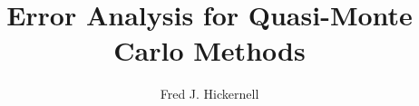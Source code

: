\documentclass[graybox,footinfo]{svmult}
\begin{document}
\newcommand{\MLE}{\text{MLE}}
\newcommand{\mC}{\mathsf{C}}
\newcommand{\Ex}{\mathbb{E}}
\newcommand{\Prob}{\mathbb{P}}
\newcommand{\cf}{\mathcal{F}}
\newcommand{\cl}{\mathcal{L}}
\newcommand{\cn}{\mathcal{N}}
\newcommand{\Order}{\mathcal{O}}
\newcommand{\cm}{\mathcal{M}}
\newcommand{\cg}{\mathcal{G}}
\newcommand{\cp}{\mathcal{P}}
\newcommand{\cu}{\mathcal{U}}
\newcommand{\cx}{\mathcal{X}}
\newcommand{\cy}{\mathcal{Y}}
\newcommand{\cz}{\mathcal{Z}}
\newcommand{\natm}{\N_{0,m}}
\newcommand{\cube}{[0,1)^d}
\newcommand{\hf}{\hat{f}}
\newcommand{\rf}{\mathring{f}}
\newcommand{\tf}{\tilde{f}}
\newcommand{\hg}{\hat{g}}
\newcommand{\hmu}{\widehat{\mu}}
\newcommand{\hI}{\hat{I}}
\newcommand{\tvk}{\tilde{\bsk}}
\newcommand{\hS}{\widehat{S}}
\newcommand{\tS}{\widetilde{S}}
\newcommand{\wcS}{\widecheck{S}}
\newcommand{\rnu}{\mathring{\nu}}
\newcommand{\tnu}{\widetilde{\nu}}
\newcommand{\hnu}{\widehat{\nu}}
\newcommand{\homega}{\widehat{\omega}}
\newcommand{\wcomega}{\mathring{\omega}}
\newcommand{\fC}{\mathfrak{C}}
\newcommand{\nodes}{\{\bsz_i\}_{i=0}^{\infty}}
\newcommand{\nodesn}{\{\bsz_i\}_{i=0}^{n-1}}
\newcommand{\norm}[1]{\ensuremath{\left \lVert #1 \right \rVert}} 
\newcommand{\snorm}[1]{\ensuremath{\left \lVert #1 \right \rVert}} 
\newcommand{\bignorm}[1]{\ensuremath{\bigl \lVert #1 \bigr \rVert}}
\newcommand{\Bignorm}[1]{\ensuremath{\Bigl \lVert #1 \Bigr \rVert}}
\newcommand{\abs}[1]{\ensuremath{\bigl \lvert #1 \bigr \rvert}}
\newcommand{\bigabs}[1]{\ensuremath{\bigl \lvert #1 \bigr \rvert}}
\newcommand{\Bigabs}[1]{\ensuremath{\Bigl \lvert #1 \Bigr \rvert}}
\newcommand{\biggabs}[1]{\ensuremath{\biggl \lvert #1 \biggr \rvert}}
\newcommand{\Biggabs}[1]{\ensuremath{\Biggl \lvert #1 \Biggr \rvert}}
\newcommand{\ip}[3][{}]{\ensuremath{\left \langle #2, #3 \right \rangle_{#1}}}
\newcommand{\err}{\textrm{err}}
\newcommand{\tbsone}{\tilde{\bsone}}
\newcommand{\tvarrho}{\tilde{\varrho}}
\newcommand{\rvarrho}{\mathring{\varrho}}
\newcommand{\tc}{\tilde{c}}
\newcommand{\tbsc}{\tilde{\bsc}}
\newcommand{\tbsy}{\tilde{\bsy}}
\newcommand{\tmC}{\widetilde{\mC}}
\newcommand{\tz}{\tilde{z}}
\newcommand{\tbsz}{\tilde{\bsz}}

\allowdisplaybreaks


\title*{Error Analysis for Quasi-Monte Carlo Methods}
\author{Fred J. Hickernell}
\maketitle
\end{document}
